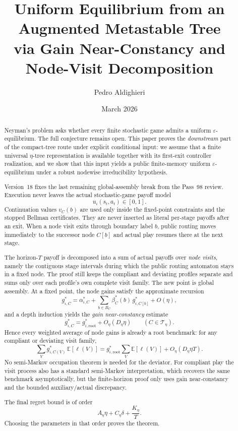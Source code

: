\documentclass[12pt]{article}
\title{\textbf{Uniform Equilibrium from an Augmented Metastable Tree\\via Gain Near-Constancy and Node-Visit Decomposition}}
\author{Pedro Aldighieri}
\date{March 2026}
\theoremstyle{definition}
\newcommand{\eps}{\varepsilon}
\newcommand{\E}{\mathbb{E}}
\newcommand{\1}{\mathbf{1}}
\newcommand{\cT}{\mathcal{T}}
\begin{document}
\maketitle




\begin{abstract}
Neyman's problem asks whether every finite stochastic game admits a uniform
$\eps$-equilibrium. The full conjecture remains open. This paper proves the
\emph{downstream} part of the compact-tree route under explicit conditional input:
we assume that a finite universal $\eta$-tree representation is available
together with its first-exit controller realization, and we show that this input
yields a public finite-memory uniform $\eps$-equilibrium under a robust
nodewise irreducibility hypothesis.

Version~18 fixes the last remaining global-assembly break from the Pass~98
review. Execution never leaves the actual stochastic-game payoff model
\[
u_i(s_t,a_t)\in[0,1].
\]
Continuation values $v_C(b)$ are used only inside the fixed-point constraints and
the stopped Bellman certificates. They are never inserted as literal per-stage
payoffs after an exit. When a node visit exits through boundary label $b$, public
routing moves immediately to the successor node $C[b]$ and actual play resumes
there at the next stage.

The horizon-$T$ payoff is decomposed into a sum of actual payoffs over
\emph{node visits}, namely the contiguous stage intervals during which the public
routing automaton stays in a fixed node. The proof still keeps the compliant and
deviating profiles separate and sums only over each profile's own complete visit
family. The new point is global assembly. At a fixed point, the node gains satisfy
the approximate recursion
\[
g_{i,C}^*
=
\alpha_{i,C}^*
+
\sum_{b\in B_C}\beta_C^*(b)\,g_{i,C[b]}^*
+
O(\eta),
\]
and a depth induction yields the \emph{gain near-constancy} estimate
\[
g_{i,C}^*
=
g_{i,\mathrm{root}}^*+O_\eta(D_\eta\eta)
\qquad (C\in\cT_\eta).
\]
Hence every weighted average of node gains is already a root benchmark:
for any compliant or deviating visit family,
\[
\sum_V g_{i,C(V)}^*\,\E[\ell(V)]
=
g_{i,\mathrm{root}}^*\sum_V \E[\ell(V)]
+
O_\eta(D_\eta\eta T).
\]
No semi-Markov occupation theorem is needed for the deviator. For compliant play
the visit process also has a standard semi-Markov interpretation, which recovers
the same benchmark asymptotically, but the finite-horizon proof only uses gain
near-constancy and the bounded auxiliary/actual discrepancy.

The final regret bound is of order
\[
A_\eta\eta + C_\eta\delta + \frac{K_\eta}{T}.
\]
Choosing the parameters in that order proves the theorem.
\end{abstract}
\end{document}
